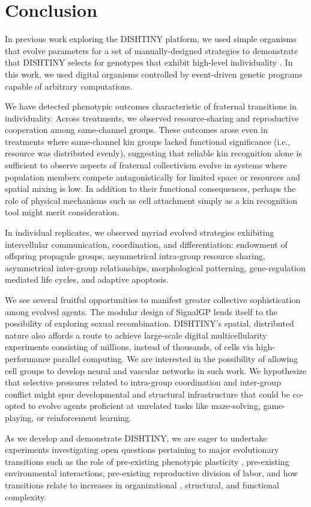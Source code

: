 \section{Conclusion}

In previous work exploring the DISHTINY platform, we used simple organisms that evolve parameters for a set of manually-designed strategies to demonstrate that DISHTINY selects for genotypes that exhibit high-level individuality \cite{moreno2019toward}.
In this work, we used digital organisms controlled by event-driven genetic programs capable of arbitrary computations.

We have detected phenotypic outcomes characteristic of fraternal transitions in individuality.
Across treatments, we observed resource-sharing and reproductive cooperation among same-channel groups.
These outcomes arose even in treatments where same-channel kin groups lacked functional significance (i.e., resource was distributed evenly), suggesting that reliable kin recognition alone is sufficient to observe aspects of fraternal collectivism evolve in systems where population members compete antagonistically for limited space or resources and spatial mixing is low.
In addition to their functional consequences, perhaps the role of physical mechanisms such as cell attachment simply as a kin recognition tool might merit consideration.

In individual replicates, we observed myriad evolved strategies exhibiting intercellular communication, coordination, and differentiation: endowment of offspring propagule groups, asymmetrical intra-group resource sharing, asymmetrical inter-group relationships, morphological patterning, gene-regulation mediated life cycles, and adaptive apoptosis.

We see several fruitful opportunities to manifest greater collective sophistication among evolved agents.
The modular design of SignalGP lends itself to the possibility of exploring sexual recombination.
DISHTINY's spatial, distributed nature also affords a route to achieve large-scale digital multicellularity experiments consisting of millions, instead of thousands, of cells via high-performance parallel computing.
We are interested in the possibility of allowing cell groups to develop neural and vascular networks in such work.
We hypothesize that selective pressures related to intra-group coordination and inter-group conflict might spur developmental and structural infrastructure that could be co-opted to evolve agents proficient at unrelated tasks like maze-solving, game-playing, or reinforcement learning.

As we develop and demonstrate DISHTINY, we are eager to undertake experiments investigating open questions pertaining to major evolutionary transitions such as the role of pre-existing phenotypic plasticity \citep{clune2007investigating, lalejini2016evolutionary}, pre-existing environmental interactions, pre-existing reproductive division of labor, and how transitions relate to increases in organizational \citep{goldsby2012task}, structural, and functional \citep{goldsby2014evolutionary} complexity.
